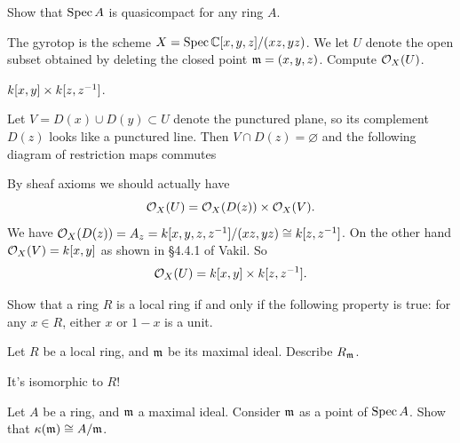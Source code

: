 \begin{dproblem}
	\onechili
	Show that $\operatorname{Spec} A$ is quasicompact for any ring $A$.
\end{dproblem}

\begin{problem}
	The gyrotop is the scheme $X = \operatorname{Spec} \mathbb C[x,y,z] / (xz,yz)$.
	We let $U$ denote the open subset obtained
	by deleting the closed point $\mathfrak m = (x,y,z)$.
	Compute $\mathcal O_X(U)$.
	\begin{hint}
		$k[x,y] \times k[z,z^{-1}]$.
	\end{hint}
	\begin{sol}
		Let $V = D(x) \cup D(y) \subset U$ denote the punctured plane,
		so its complement $D(z)$ looks like a punctured line.
		Then $V \cap D(z) = \varnothing$ and the following diagram
		of restriction maps commutes
		\begin{center}
		\end{center}
		By sheaf axioms we should actually have
		\[ \mathcal O_X(U) = \mathcal O_X(D(z)) \times \mathcal O_X(V). \]
		We have $\mathcal O_X(D(z)) = A_z = k[x,y,z,z^{-1}]/(xz,yz) \cong k[z,z^{-1}]$.
		On the other hand $\mathcal O_X(V) = k[x,y]$ as shown in \S4.4.1 of Vakil.
		So
		\[ \mathcal O_X(U) = k[x,y] \times k[z,z^{-1}]. \]
	\end{sol}
\end{problem}

\begin{problem}
	Show that a ring $R$ is a local ring
	if and only if the following property is true:
	for any $x \in R$,
	either $x$ or $1-x$ is a unit.
\end{problem}

\begin{problem}
	Let $R$ be a local ring, and $\mathfrak m$ be its maximal ideal.
	Describe $R_\mathfrak m$.
	\begin{hint}
		It's isomorphic to $R$!
	\end{hint}
\end{problem}

\begin{problem}
	Let $A$ be a ring, and $\mathfrak m$ a maximal ideal.
	Consider $\mathfrak m$ as a point of $\operatorname{Spec} A$.
	Show that $\kappa(\mathfrak m) \cong A/\mathfrak m$.
\end{problem}
